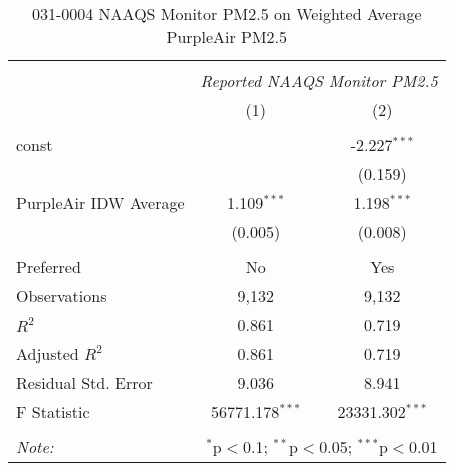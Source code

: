 \begin{table}[!htbp] \centering
  \caption{031-0004 NAAQS Monitor PM2.5 on Weighted Average PurpleAir PM2.5}
  \label{tab:reg_031-0004}
\begin{tabular}{@{\extracolsep{5pt}}lcc}
\\[-1.8ex]\hline
\hline \\[-1.8ex]
& \multicolumn{2}{c}{\textit{Reported NAAQS Monitor PM2.5}} \
\cr \cline{2-3}
\\[-1.8ex] & (1) & (2) \\
\hline \\[-1.8ex]
 const & & -2.227$^{***}$ \\
  & & (0.159) \\
 PurpleAir IDW Average & 1.109$^{***}$ & 1.198$^{***}$ \\
  & (0.005) & (0.008) \\
\hline \\[-1.8ex]
 Preferred & No & Yes \\
 Observations & 9,132 & 9,132 \\
 $R^2$ & 0.861 & 0.719 \\
 Adjusted $R^2$ & 0.861 & 0.719 \\
 Residual Std. Error & 9.036 & 8.941  \\
 F Statistic & 56771.178$^{***}$  & 23331.302$^{***}$  \\
\hline
\hline \\[-1.8ex]
\textit{Note:} & \multicolumn{2}{r}{$^{*}$p$<$0.1; $^{**}$p$<$0.05; $^{***}$p$<$0.01} \\
\end{tabular}
\end{table}